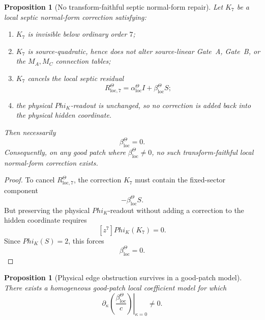 \documentclass[11pt,a4paper]{amsart}
\def\Phi{Phi}%
\theoremstyle{plain}
\newtheorem{proposition}[theorem]{Proposition}
\theoremstyle{definition}
\newcommand{\loc}{\mathrm{loc}}
\begin{document}
\begin{proposition}[No transform-faithful septic normal-form repair]
\label{prop:no-transform-faithful-septic-normal-form-repair}
Let \(K_7\) be a local septic normal-form correction satisfying:
\begin{enumerate}
\item \(K_7\) is invisible below ordinary order \(7\);
\item \(K_7\) is source-quadratic, hence does not alter source-linear Gate~A,
Gate~B, or the \(M_A,M_C\) connection tables;
\item \(K_7\) cancels the local septic residual
\[
R_{\loc,7}^{\Theta}
=
\alpha_{\loc}^{\Theta}I+\beta_{\loc}^{\Theta}S;
\]
\item the physical \(\Phi_K\)-readout is unchanged, so no correction is added
back into the physical hidden coordinate.
\end{enumerate}
Then necessarily
\[
\beta_{\loc}^{\Theta}=0.
\]
Consequently, on any good patch where \(\beta_{\loc}^{\Theta}\ne0\), no such
transform-faithful local normal-form correction exists.
\end{proposition}

\begin{proof}
To cancel \(R_{\loc,7}^{\Theta}\), the correction \(K_7\) must contain the
fixed-sector component
\[
-\beta_{\loc}^{\Theta}S.
\]
But preserving the physical \(\Phi_K\)-readout without adding a correction to
the hidden coordinate requires
\[
[z^7]\Phi_K(K_7)=0.
\]
Since \(\Phi_K(S)=2\), this forces
\[
\beta_{\loc}^{\Theta}=0.
\]
\end{proof}

\begin{proposition}[Physical edge obstruction survives in a good-patch model]
\label{prop:theta-physical-edge-obstruction-good-patch}
There exists a homogeneous good-patch local coefficient model for which
\[
\left.
\partial_\kappa
\left(
\frac{\beta_{\loc}^{\Theta}}{c}
\right)
\right|_{\kappa=0}
\ne0.
\]
\end{proposition}
\end{document}
